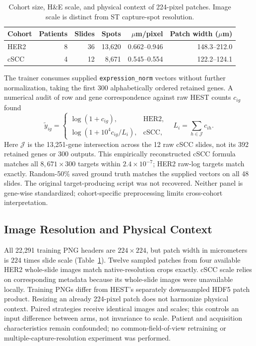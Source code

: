 \begin{table}[htbp]
\centering
\caption{Cohort size, H\&E scale, and physical context of 224-pixel patches. Image scale is distinct from ST capture-spot resolution.}
\label{tab:datasets}
\begin{tabular}{lrrrrr}
\hline
Cohort & Patients & Slides & Spots & $\mu$m/pixel & Patch width ($\mu$m) \\
\hline
HER2 & 8 & 36 & 13,620 & 0.662--0.946 & 148.3--212.0 \\
cSCC & 4 & 12 & 8,671 & 0.545--0.554 & 122.2--124.1 \\
\hline
\end{tabular}
\end{table}

The trainer consumes supplied \texttt{expression\_norm} vectors without further normalization, taking the first 300 alphabetically ordered retained genes. A numerical audit of row and gene correspondence against raw HEST counts $c_{ig}$ found
\begin{equation}
\tilde y_{ig}=\begin{cases}
\log(1+c_{ig}), &\text{HER2},\\
\log(1+10^4c_{ig}/L_i), &\text{cSCC},
\end{cases}
\quad L_i=\sum_{h\in\mathcal J}c_{ih}.
\label{eq:targets}
\end{equation}
Here $\mathcal J$ is the 13,251-gene intersection across the 12 raw cSCC slides, not its 392 retained genes or 300 outputs. This empirically reconstructed cSCC formula matches all $8{,}671\times300$ targets within $2.4\times10^{-7}$; HER2 raw-log targets match exactly. Random-50\% saved ground truth matches the supplied vectors on all 48 slides. The original target-producing script was not recovered. Neither panel is gene-wise standardized; cohort-specific preprocessing limits cross-cohort interpretation.

\subsection{Image Resolution and Physical Context}
\label{sec:resolution}

All 22,291 training PNG headers are $224\times224$, but patch width in micrometers is $224$ times slide scale (Table~\ref{tab:datasets}). Twelve sampled patches from four available HER2 whole-slide images match native-resolution crops exactly. cSCC scale relies on corresponding metadata because its whole-slide images were unavailable locally. Training PNGs differ from HEST's separately downsampled HDF5 patch product. Resizing an already 224-pixel patch does not harmonize physical context. Paired strategies receive identical images and scales; this controls an input difference between arms, not invariance to scale. Patient and acquisition characteristics remain confounded; no common-field-of-view retraining or multiple-capture-resolution experiment was performed.

